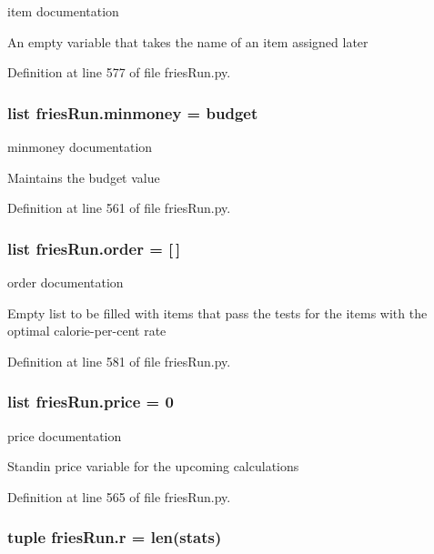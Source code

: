 item documentation 

An empty variable that takes the name of an item assigned later 

Definition at line 577 of file fries\-Run.\-py.

\hypertarget{namespacefriesRun_ab2aa697595b4ab49fb9d6eef19325132}{
\subsubsection[{minmoney}]{\setlength{\rightskip}{0pt plus 5cm}list fries\-Run.\-minmoney = {\bf budget}}}\label{namespacefriesRun_ab2aa697595b4ab49fb9d6eef19325132}


minmoney documentation 

Maintains the budget value 

Definition at line 561 of file fries\-Run.\-py.

\hypertarget{namespacefriesRun_a9c48e98f9ae969ff6187caf02a174dd2}{
\subsubsection[{order}]{\setlength{\rightskip}{0pt plus 5cm}list fries\-Run.\-order = \mbox{[}$\,$\mbox{]}}}\label{namespacefriesRun_a9c48e98f9ae969ff6187caf02a174dd2}


order documentation 

Empty list to be filled with items that pass the tests for the items with the optimal calorie-\/per-\/cent rate 

Definition at line 581 of file fries\-Run.\-py.

\hypertarget{namespacefriesRun_a5cb73a953818862c3de65f99d3fec81f}{
\subsubsection[{price}]{\setlength{\rightskip}{0pt plus 5cm}list fries\-Run.\-price = 0}}\label{namespacefriesRun_a5cb73a953818862c3de65f99d3fec81f}


price documentation 

Standin price variable for the upcoming calculations 

Definition at line 565 of file fries\-Run.\-py.

\hypertarget{namespacefriesRun_a6e20b08beff3af2f39de05039de80600}{
\subsubsection[{r}]{\setlength{\rightskip}{0pt plus 5cm}tuple fries\-Run.\-r = len({\bf stats})}}\label{namespacefriesRun_a6e20b08beff3af2f39de05039de80600}



